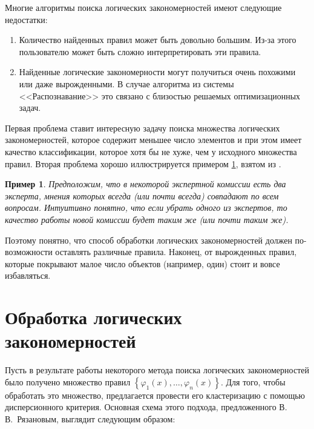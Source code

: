 \documentclass[12pt]{article}
\newtheorem{example}{Пример}
\begin{document}
Многие алгоритмы поиска логических закономерностей имеют следующие
недостатки:

\begin{enumerate}
\item Количество найденных правил может быть довольно большим. Из-за
  этого пользователю может быть сложно интерпретировать эти правила.
\item Найденные логические закономерности могут получиться очень
  похожими или даже вырожденными. В случае алгоритма из системы
  <<Распознавание>> это связано с близостью решаемых оптимизационных
  задач.
\end{enumerate}

Первая проблема ставит интересную задачу поиска множества логических
закономерностей, которое содержит меньшее число элементов и при этом
имеет качество классификации, которое хотя бы не хуже, чем у исходного
множества правил. Вторая проблема хорошо иллюстрируется примером
\ref{ex:same:experts}, взятом из \cite{voron10logicalgs}.

\begin{example}\label{ex:same:experts}
  Предположим, что в некоторой экспертной комиссии есть два эксперта,
  мнения которых всегда (или почти всегда) совпадают по всем
  вопросам. Интуитивно понятно, что если убрать одного из экспертов,
  то качество работы новой комиссии будет таким же (или почти таким
  же).
\end{example}

Поэтому понятно, что способ обработки логических закономерностей
должен по-возможности оставлять различные правила. Наконец, от
вырожденных правил, которые покрывают малое число объектов (например,
один) стоит и вовсе избавляться.

\section{Обработка логических закономерностей}
\label{sec:processing}


Пусть в результате работы некоторого метода поиска логических
закономерностей было получено множество правил \(\left\{\varphi_1(x),
\dots, \varphi_n(x)\right\}\). Для того, чтобы обработать это
множество, предлагается провести его кластеризацию с помощью
дисперсионного критерия. Основная схема этого подхода, предложенного
В.\,В.~Рязановым, выглядит следующим образом:
\end{document}
